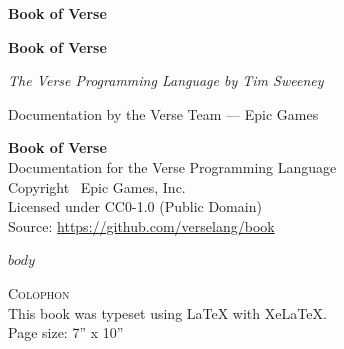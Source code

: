 \documentclass[11pt,openright,twoside]{book}
\begin{document}
\frontmatter

\begin{titlepage}
\centering
\vspace*{3in}
{\Huge\sffamily\bfseries Book of Verse}
\vfill
\end{titlepage}

\cleardoublepage

\begin{titlepage}
\centering
\vspace*{1.5in}
{\Huge\sffamily\bfseries\color{versegray} Book of Verse}\par
\vspace{0.5in}
{\Large\itshape The Verse Programming Language by Tim Sweeney}\par
\vspace{1in}
{\large Documentation by the Verse Team --- Epic Games}
\vfill
\end{titlepage}

\cleardoublepage

\thispagestyle{empty}
\vspace*{\fill}
\begin{center}
\textbf{Book of Verse}\\[1em]
Documentation for the Verse Programming Language\\[2em]
Copyright \textcopyright\ Epic Games, Inc.\\[1em]
Licensed under CC0-1.0 (Public Domain)\\[2em]
Source: \url{https://github.com/verselang/book}
\end{center}
\vfill
\cleardoublepage

\tableofcontents
\cleardoublepage

\mainmatter

$body$

\backmatter

\cleardoublepage
\thispagestyle{empty}
\vspace*{\fill}
\begin{center}
\textsc{Colophon}\\[2em]
This book was typeset using \LaTeX{} with XeLaTeX.\\[1em]
Page size: 7'' x 10''
\end{center}
\vfill
\end{document}
